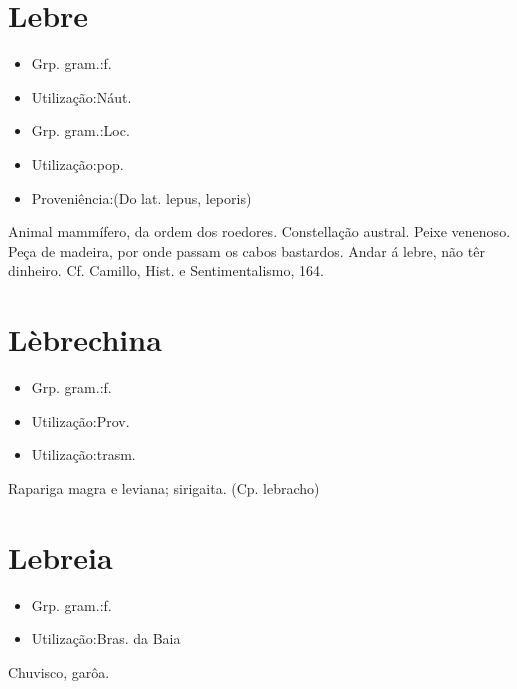\section{Lebre}
\begin{itemize}
\item {Grp. gram.:f.}
\end{itemize}
\begin{itemize}
\item {Utilização:Náut.}
\end{itemize}
\begin{itemize}
\item {Grp. gram.:Loc.}
\end{itemize}
\begin{itemize}
\item {Utilização:pop.}
\end{itemize}
\begin{itemize}
\item {Proveniência:(Do lat. \textunderscore lepus\textunderscore , \textunderscore leporis\textunderscore )}
\end{itemize}
Animal mammífero, da ordem dos roedores.
Constellação austral.
Peixe venenoso.
Peça de madeira, por onde passam os cabos bastardos.
\textunderscore Andar á lebre\textunderscore , não têr dinheiro. Cf. Camillo, \textunderscore Hist. e Sentimentalismo\textunderscore , 164.
\section{Lèbrechina}
\begin{itemize}
\item {Grp. gram.:f.}
\end{itemize}
\begin{itemize}
\item {Utilização:Prov.}
\end{itemize}
\begin{itemize}
\item {Utilização:trasm.}
\end{itemize}
Rapariga magra e leviana; sirigaita.
(Cp. \textunderscore lebracho\textunderscore )
\section{Lebreia}
\begin{itemize}
\item {Grp. gram.:f.}
\end{itemize}
\begin{itemize}
\item {Utilização:Bras. da Baia}
\end{itemize}
Chuvisco, garôa.
